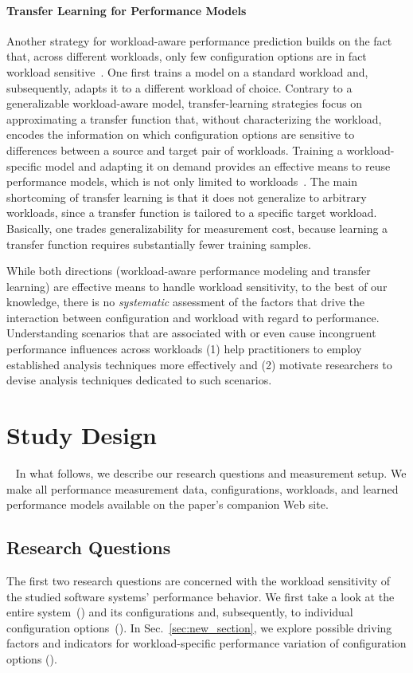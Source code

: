 {\paragraph{Transfer Learning for Performance Models}\label{sec:transfer}
Another strategy for workload-aware performance prediction builds on the fact that, across different workloads, only few configuration options are in fact workload sensitive~\cite{jamishidi_transfer_2017}. One first trains a model on a standard workload and, subsequently, adapts it to a different workload of choice. Contrary to a generalizable workload-aware model, transfer-learning strategies focus on approximating a transfer function that, without characterizing the workload, encodes the information on which configuration options are sensitive to differences between a source and target pair of workloads. Training a workload-specific model and adapting it on demand provides an effective means to reuse performance models, which is not only limited to workloads~\cite{jamshidi_learning_2018, ding_bayesian_2020,valov_transferring_performance_2017,martin_transfer_2021}. The main shortcoming of transfer learning is that it does not generalize to arbitrary workloads, since a transfer function is tailored to a specific target workload. Basically, one trades generalizability for measurement cost, because learning a transfer function requires substantially fewer training samples.

While both directions (workload-aware performance modeling and transfer learning) are effective means to handle workload sensitivity, to the best of our knowledge, there is no \textit{systematic} assessment of the factors that drive the interaction between configuration and workload with regard to performance. Understanding scenarios that are associated with or even cause incongruent performance influences across workloads (1) help practitioners to employ established analysis techniques more effectively and (2) motivate researchers to devise analysis techniques dedicated to such scenarios.

\section{Study Design}~\label{sec:study}
In what follows, we describe our research questions and measurement setup. We make all performance measurement data, configurations, workloads, and learned performance models available on the paper's companion Web site.

\subsection{Research Questions}
The first two research questions are concerned with the workload sensitivity of the studied software systems' performance behavior. We first take a look at the entire system~() and its configurations and, subsequently, to individual configuration options~(). In Sec.~\ref{sec:new_section}, we explore possible driving factors and indicators for workload-specific performance variation of configuration options ().

}
